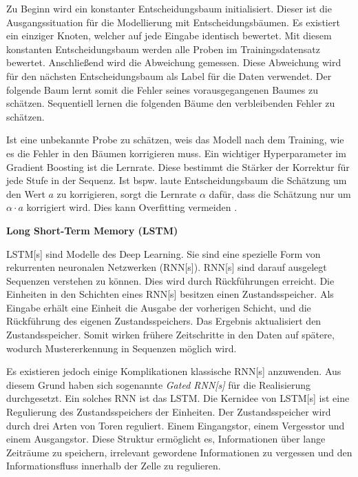 Zu Beginn wird ein konstanter Entscheidungsbaum initialisiert. Dieser ist die Ausgangssituation für die Modellierung mit Entscheidungsbäumen. Es existiert ein einziger Knoten, welcher auf jede Eingabe identisch bewertet. Mit diesem konstanten Entscheidungsbaum werden alle Proben im \gls{Trainingsdatensatz} bewertet. Anschließend wird die Abweichung gemessen. Diese Abweichung wird für den nächsten Entscheidungsbaum als \gls{Label} für die Daten verwendet. Der folgende Baum lernt somit die Fehler seines vorausgegangenen Baumes zu schätzen. Sequentiell lernen die folgenden Bäume den verbleibenden Fehler zu schätzen. \par

Ist eine unbekannte Probe zu schätzen, weis das Modell nach dem Training, wie es die Fehler in den Bäumen korrigieren muss. Ein wichtiger \gls{Hyperparameter} im Gradient Boosting ist die Lernrate. Diese bestimmt die Stärker der Korrektur für jede Stufe in der Sequenz. Ist bspw. laute Entscheidungsbaum die Schätzung um den Wert \(a\) zu korrigieren, sorgt die Lernrate \(\alpha\) dafür, dass die Schätzung nur um \(\alpha \cdot a\) korrigiert wird. Dies kann Overfitting vermeiden \cite{Burkov.2019}. \dubpar


\textbf{Long Short-Term Memory (\acrshort{LSTM})} \par
\acrshort{LSTM}[s] sind Modelle des \gls{Deep Learning}. Sie sind eine spezielle Form von rekurrenten neuronalen Netzwerken (\acrshort{RNN}[s]). \acrshort{RNN}[s] sind darauf ausgelegt Sequenzen verstehen zu können. Dies wird durch Rückführungen erreicht. Die Einheiten in den Schichten eines \acrshort{RNN}[s] besitzen einen Zustandsspeicher. Als Eingabe erhält eine Einheit die Ausgabe der vorherigen Schicht, und die Rückführung des eigenen Zustandsspeichers. Das Ergebnis aktualisiert den Zustandsspeicher. Somit wirken frühere Zeitschritte in den Daten auf spätere, wodurch Mustererkennung in Sequenzen möglich wird.\par

Es existieren jedoch einige Komplikationen klassische \acrshort{RNN}[s] anzuwenden. Aus diesem Grund haben sich sogenannte \textit{Gated \acrshort{RNN}[s]} für die Realisierung durchgesetzt. Ein solches \acrshort{RNN} ist das \acrshort{LSTM}. Die Kernidee von \acrshort{LSTM}[s] ist eine Regulierung des Zustandsspeichers der Einheiten. Der Zustandsspeicher wird durch drei Arten von Toren reguliert. Einem Eingangstor, einem Vergesstor und einem Ausgangstor. Diese Struktur ermöglicht es, Informationen über lange Zeiträume zu speichern, irrelevant gewordene Informationen zu vergessen und den Informationsfluss innerhalb der Zelle zu regulieren.

